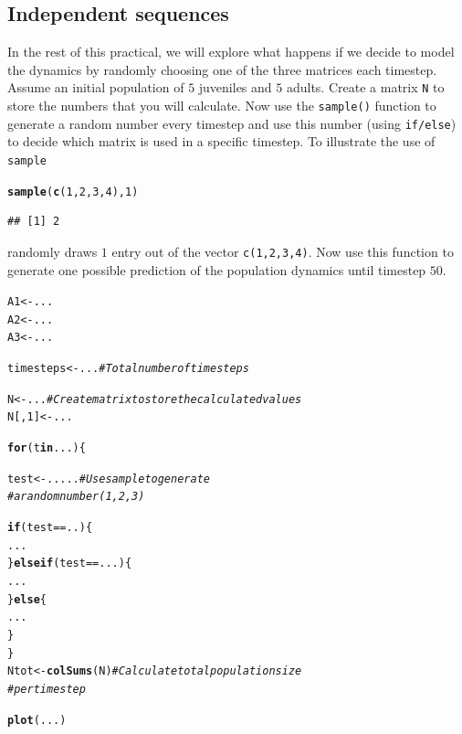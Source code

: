 \documentclass{article}\usepackage[]{graphicx}\usepackage[]{color}
\makeatletter
\newcommand{\hlnum}[1]{\textcolor[rgb]{0.686,0.059,0.569}{#1}}%
\newcommand{\hlcom}[1]{\textcolor[rgb]{0.678,0.584,0.686}{\textit{#1}}}%
\newcommand{\hlopt}[1]{\textcolor[rgb]{0,0,0}{#1}}%
\newcommand{\hlstd}[1]{\textcolor[rgb]{0.345,0.345,0.345}{#1}}%
\newcommand{\hlkwa}[1]{\textcolor[rgb]{0.161,0.373,0.58}{\textbf{#1}}}%
\newcommand{\hlkwb}[1]{\textcolor[rgb]{0.69,0.353,0.396}{#1}}%
\newcommand{\hlkwd}[1]{\textcolor[rgb]{0.737,0.353,0.396}{\textbf{#1}}}%
\newenvironment{kframe}{%
 \def\at@end@of@kframe{}%
 \ifinner\ifhmode%
  \def\at@end@of@kframe{\end{minipage}}%
  \begin{minipage}{\columnwidth}%
 \fi\fi%
 \def\FrameCommand##1{\hskip\@totalleftmargin \hskip-\fboxsep
 \colorbox{shadecolor}{##1}\hskip-\fboxsep
     \hskip-\linewidth \hskip-\@totalleftmargin \hskip\columnwidth}%
 \MakeFramed {\advance\hsize-\width
   \@totalleftmargin\z@ \linewidth\hsize
   \@setminipage}}%
 {\par\unskip\endMakeFramed%
 \at@end@of@kframe}
\newenvironment{knitrout}{}{} %
\makeatother
\begin{document}
\subsection{Independent sequences}
In the rest of this practical, we will explore what happens if we decide to model the dynamics by randomly choosing one of the three matrices each timestep. Assume an initial population of $5$ juveniles and $5$ adults. Create a matrix \texttt{N} to store the numbers that you will calculate. Now use the \texttt{sample()} function to generate a random number every timestep and use this number (using \texttt{if/else}) to decide which matrix is used in a specific timestep. To illustrate the use of \texttt{sample}
\begin{knitrout}
\color{fgcolor}\begin{kframe}
\begin{alltt}
\hlkwd{sample}\hlstd{(}\hlkwd{c}\hlstd{(}\hlnum{1}\hlstd{,}\hlnum{2}\hlstd{,}\hlnum{3}\hlstd{,}\hlnum{4}\hlstd{),}\hlnum{1}\hlstd{)}
\end{alltt}
\begin{verbatim}
## [1] 2
\end{verbatim}
\end{kframe}
\end{knitrout}
randomly draws $1$ entry out of the vector \texttt{c(1,2,3,4)}. Now use this function to generate one possible prediction of the population dynamics until timestep $50$.
\begin{knitrout}
\color{fgcolor}\begin{kframe}
\begin{alltt}
\hlstd{A1}\hlkwb{<-}\hlstd{...}
\hlstd{A2}\hlkwb{<-}\hlstd{...}
\hlstd{A3}\hlkwb{<-}\hlstd{...}

\hlstd{timesteps}\hlkwb{<-}\hlstd{...} \hlcom{# Total number of timesteps}

\hlstd{N}\hlkwb{<-}\hlstd{...} \hlcom{# Create matrix to store the calculated values}
\hlstd{N[,}\hlnum{1}\hlstd{]}\hlkwb{<-}\hlstd{...}

\hlkwa{for}\hlstd{(t} \hlkwa{in} \hlstd{...)\{}

  \hlstd{test}\hlkwb{<-}\hlstd{.....} \hlcom{# Use sample to generate }
              \hlcom{# a random number (1,2,3)}

  \hlkwa{if}\hlstd{(test}\hlopt{==}\hlstd{..)\{}
    \hlstd{...}
  \hlstd{\}}\hlkwa{else if}\hlstd{(test}\hlopt{==}\hlstd{...)\{}
    \hlstd{...}
  \hlstd{\}}\hlkwa{else}\hlstd{\{}
    \hlstd{...}
  \hlstd{\}}
\hlstd{\}}
\hlstd{Ntot}\hlkwb{<-}\hlkwd{colSums}\hlstd{(N)}  \hlcom{# Calculate total population size}
                  \hlcom{# per timestep}

\hlkwd{plot}\hlstd{(...)}
\end{alltt}
\end{kframe}
\end{knitrout}
\end{document}

